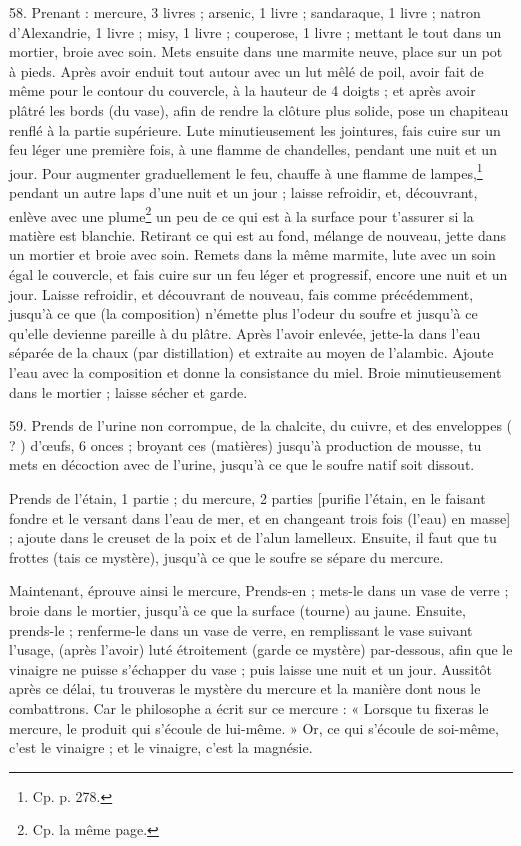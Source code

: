 \documentclass[a4paper, 11pt, oneside, polutonikogreek, french]{article}
\begin{document}
58. Prenant : mercure, 3 livres ; arsenic, 1 livre ; sandaraque, 1 livre ; natron d'Alexandrie, 1 livre ; misy, 1 livre ; couperose, 1 livre ; mettant le tout dans un mortier, broie avec soin. Mets ensuite dans une marmite neuve, place sur un pot à pieds. Après avoir enduit tout autour avec un lut mêlé de poil, avoir fait de même pour le contour du couvercle, à la hauteur de 4 doigts ; et après avoir plâtré les bords (du vase), afin de rendre la clôture plus solide, pose un chapiteau renflé à la partie supérieure. Lute minutieusement les jointures, fais cuire sur un feu léger une première fois, à une flamme de chandelles, pendant une nuit et un jour. Pour augmenter graduellement le feu, chauffe à une flamme de lampes,\footnote{Cp. p. 278.} pendant un autre laps d'une nuit et un jour ; laisse refroidir, et, découvrant, enlève avec une plume\footnote{Cp. la même page.} un peu de ce qui est à la surface pour t'assurer si la matière est blanchie. Retirant ce qui est au fond, mélange de nouveau, jette dans un mortier et broie avec soin. Remets dans la même marmite, lute avec un soin égal le couvercle, et fais cuire sur un feu léger et progressif, encore une nuit et un jour. Laisse refroidir, et découvrant de nouveau, fais comme précédemment, jusqu'à ce que (la composition) n'émette plus l'odeur du soufre et jusqu'à ce qu'elle devienne pareille à du plâtre. Après l'avoir enlevée, jette-la dans l'eau séparée de la chaux (par distillation) et extraite au moyen de l'alambic. Ajoute l'eau avec la composition et donne la consistance du miel. Broie minutieusement dans le mortier ; laisse sécher et garde.

59. Prends de l'urine non corrompue, de la chalcite, du cuivre, et des enveloppes ( ? ) d'œufs, 6 onces ; broyant ces (matières) jusqu'à production de mousse, tu mets en décoction avec de l'urine, jusqu'à ce que le soufre natif soit dissout.

Prends de l'étain, 1 partie ; du mercure, 2 parties [purifie l'étain, en le faisant fondre et le versant dans l'eau de mer, et en changeant trois fois (l'eau) en masse] ; ajoute dans le creuset de la poix et de l'alun lamelleux. Ensuite, il faut que tu frottes (tais ce mystère), jusqu'à ce que le soufre se sépare du mercure.

Maintenant, éprouve ainsi le mercure, Prends-en ; mets-le dans un vase de verre ; broie dans le mortier, jusqu'à ce que la surface (tourne) au jaune. Ensuite, prends-le ; renferme-le dans un vase de verre, en remplissant le vase suivant l'usage, (après l'avoir) luté étroitement (garde ce mystère) par-dessous, afin que le vinaigre ne puisse s'échapper du vase ; puis laisse une nuit et un jour. Aussitôt après ce délai, tu trouveras le mystère du mercure et la manière dont nous le combattrons. Car le philosophe a écrit sur ce mercure : « Lorsque tu fixeras le mercure, le produit qui s'écoule de lui-même. » Or, ce qui s'écoule de soi-même, c'est le vinaigre ; et le vinaigre, c'est la magnésie.
\end{document}
